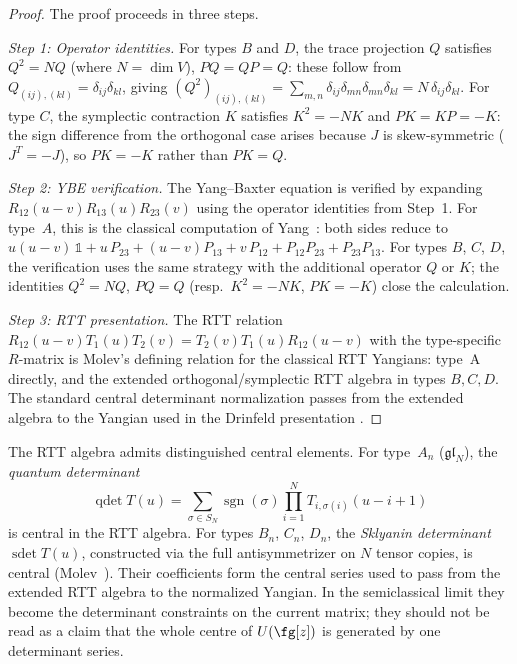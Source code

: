 \begin{proof}
The proof proceeds in three steps.

\emph{Step 1: Operator identities.}
For types $B$ and $D$, the trace projection $Q$ satisfies $Q^2 = NQ$
(where $N = \dim V$), $PQ = QP = Q$: these follow from
$Q_{(ij),(kl)} = \delta_{ij}\delta_{kl}$, giving
$(Q^2)_{(ij),(kl)} = \sum_{m,n} \delta_{ij}\delta_{mn}\delta_{mn}\delta_{kl}
= N\,\delta_{ij}\delta_{kl}$.
For type $C$, the symplectic contraction $K$ satisfies $K^2 = -NK$
and $PK = KP = -K$: the sign difference from the orthogonal case
arises because $J$ is skew-symmetric ($J^T = -J$), so
$PK = -K$ rather than $PK = Q$.

\emph{Step 2: YBE verification.}
The Yang--Baxter equation is verified by expanding
$R_{12}(u{-}v) R_{13}(u) R_{23}(v)$ using the operator identities
from Step~1. For type~$A$, this is the classical computation
of Yang~\cite{Yang67}: both sides reduce to
$u(u{-}v)\,\mathbb{1} + u\,P_{23} + (u{-}v)P_{13} + v\,P_{12}
+ P_{12}P_{23} + P_{23}P_{13}$.
For types $B$, $C$, $D$, the verification uses the same strategy
with the additional operator $Q$ or $K$; the identities $Q^2 = NQ$,
$PQ = Q$ (resp.\ $K^2 = -NK$, $PK = -K$) close the calculation.

\emph{Step 3: RTT presentation.}
The RTT relation
$R_{12}(u{-}v)T_1(u)T_2(v)=T_2(v)T_1(u)R_{12}(u{-}v)$
with the type-specific $R$-matrix is Molev's defining relation for
the classical RTT Yangians: type~A directly, and the extended
orthogonal/symplectic RTT algebra in types $B,C,D$.  The standard
central determinant normalization passes from the extended algebra to
the Yangian used in the Drinfeld presentation
\cite[Theorems 3.2.1, 4.2.1, 4.3.1, 4.4.1]{molev-yangians}.
\end{proof}

\begin{remark}
\label{rem:quantum-sklyanin-det}
The RTT algebra admits distinguished central elements.
For type~$A_n$ ($\mathfrak{gl}_{N}$), the \emph{quantum determinant}
\[
\operatorname{qdet} T(u)
= \sum_{\sigma \in S_N} \operatorname{sgn}(\sigma)
 \prod_{i=1}^{N} T_{i,\sigma(i)}(u - i + 1)
\]
is central in the RTT algebra.
For types $B_n$, $C_n$, $D_n$, the \emph{Sklyanin determinant}
$\operatorname{sdet} T(u)$, constructed via the full antisymmetrizer
on $N$ tensor copies, is central
\textup{(}Molev~\cite[Theorems~3.3.1, 4.2.5]{molev-yangians}\textup{)}.
Their coefficients form the central series used to pass from the
extended RTT algebra to the normalized Yangian.  In the semiclassical
limit they become the determinant constraints on the current matrix;
they should not be read as a claim that the whole centre of
$U(\fg[z])$ is generated by one determinant series.
\end{remark}

